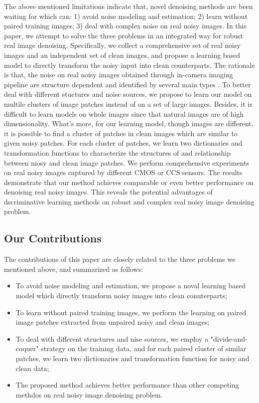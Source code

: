 \documentclass[10pt,twocolumn,letterpaper]{article}
\begin{document}
The above mentioned limitations indicate that, novel denoising methods are been waiting for which can: 1) avoid noise modeling and estimation; 2) learn without paired training images; 3) deal with complex noise on real noisy images. In this paper, we attempt to solve the three problems in an integrated way for robust real image denoising. Specifically, we collect a comprehensive set of real noisy images and an independent set of clean images, and propose a learning based model to directly transform the noisy input into clean counterparts. The rationale is that, the noise on real noisy images obtained through in-camera imaging pipeline \cite{NewInCamera} are structure dependent \cite{crosschannel2016} and identified by several main types \cite{healey1994radiometric,tsin2001statistical}. To better deal with different stuctures and noise sources, we propose to learn our model on multile clusters of image patches instead of on a set of large images. Besides, it is difficult to learn models on whole images since that natural images are of high dimensionality. What's more, for our learning model, though images are different, it is possible to find a cluster of patches in clean images which are similar to given noisy patches. For each cluster of patches, we learn two dictionaries and transformation functions to characterize the structures of and relationship between niosy and clean image patches. We perform comprehensive experiments on real noisy images captured by different CMOS or CCS sensors. The results demonstrate that our method achieves comparable or even better performance on denoising real noisy images. This reveals the potential advantages of 
dscriminative learning methods on robust and complex real noisy image denoising problem.


\subsection{Our Contributions}
The contributions of this paper are closely related to the three problems we mentioned above, and summarized as follows:
\begin{itemize}
\item To avoid noise modeling and estimation, we propose a noval learning based model which directly transform noisy images into clean conuterparts;
\item To learn without paired training images, we perform the learning on paired image patches extracted from unpaired noisy and clean images;
\item To deal with different structures and nise sources, we employ a "divide-and-coquer" strategy on the training data, and for each paired cluster of similar patches, we learn two dictionaries and transformation function for noisy and clean data;
\item The proposed method achieves better performance than other competing methdos on real noisy image denoising problem.
\end{itemize}
\end{document}
